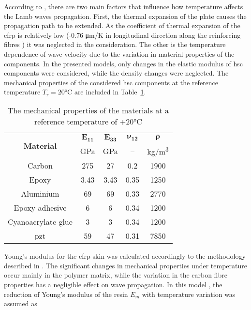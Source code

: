 \documentclass[11pt,a4paper,final]{report}
\theoremstyle{plain}
\begin{document}
According to \cite{lu2005methodology, kijanka2013gpu}, there are two main factors that influence how temperature affects the Lamb waves propagation. First, the thermal expansion of the plate causes the propagation path to be extended. As the coefficient of thermal expansion of the \ac{cfrp} is relatively low (-0.76 \unit[per-mode = symbol]{\micro\meter\per\kelvin} in longitudinal direction along the reinforcing fibres \cite{ahmed2012study}) it was neglected in the consideration.
The other is the temperature dependence of wave velocity due to the variation in material properties of the components.
In the presented models, only changes in the elastic modulus of \ac{hsc} components were considered, while the density changes were neglected.
The mechanical properties of the considered \ac{hsc} components at the reference temperature \(T_r=20\)\unit{\degreeCelsius} are included in Table~\ref{tab:properties}.
\begin{table}[H]
	\small
	\tabcolsep=0.5cm
	\centering
	\caption{\label{tab:properties}The mechanical properties of the materials at a reference temperature of +20\unit{\degreeCelsius}}
	\begin{tabular}{ccccc}\toprule
		\multirow{2}{*}{\textbf{Material}} & $\boldsymbol{E_{11}}$ & $\boldsymbol{E_{33}}$ & $\boldsymbol{\nu_{12}}$ & $\boldsymbol{\rho}$ \\ & \unit{\giga\pascal} & \unit{\giga\pascal} & -- & \unit[per-mode = symbol]{\kilogram\per\cubic\meter}\\
		\midrule
		Carbon & 275 & 27 & 0.2 & 1900\\
		Epoxy & 3.43 & 3.43 & 0.35 & 1250\\
		Aluminium & 69 & 69 & 0.33 & 2770\\
		Epoxy adhesive & 6 & 6 & 0.34 & 1200\\
		Cyanoacrylate glue & 3 & 3 & 0.34 & 1200\\	
		\ac{pzt} &  59 & 47 & 0.31 & 7850\\
		\bottomrule
	\end{tabular}
\end{table}
Young's modulus for the \ac{cfrp} skin was calculated accordingly to the methodology described in \cite{chamis1983simplified, salamone2009guided, sikdar2018effects}.
The significant changes in mechanical properties under temperature occur mainly in the polymer matrix, while the variation in the carbon fibre properties has a negligible effect on wave propagation.
In this model \cite{salamone2009guided, hopkins2012extreme}, the reduction of Young’s modulus of the resin \(E_m\) with temperature variation was assumed as
\end{document}
